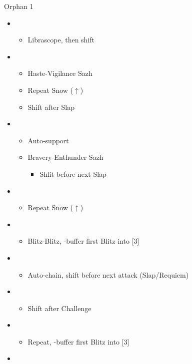 \begin{battle}{Orphan 1}
	\begin{itemize}
		\item \second
			\begin{itemize}
				\item Librascope, then shift
			\end{itemize}
		\item \fourth
			\begin{itemize}
				\item Haste-Vigilance Sazh
				\item Repeat Snow ($\uparrow$)
				\item Shift after Slap
			\end{itemize}
		\item \fifth
			\begin{itemize}
				\item Auto-support
				\item Bravery-Enthunder Sazh
					\begin{itemize}
						\item Shfit before next Slap
					\end{itemize}
			\end{itemize}
		\item \fourth
			\begin{itemize}
				\item Repeat Snow ($\uparrow$)
			\end{itemize}
		\item \sixth
			\begin{itemize}
				\item Blitz-Blitz, \rav-buffer first Blitz into [3]
			\end{itemize}
		\item \third
			\begin{itemize}
				\item Auto-chain, shift before next attack (Slap/Requiem)
			\end{itemize}
		\item \fourth
			\begin{itemize}
				\item Shift after Challenge
			\end{itemize}
		\item \sixth
			\begin{itemize}
				\item Repeat, \rav-buffer first Blitz into [3]
			\end{itemize}
		\item \third

\end{itemize}
\end{battle}
